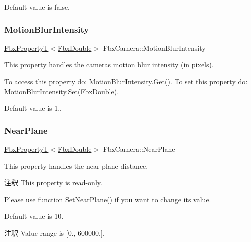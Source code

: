 Default value is false. \mbox{\label{class_fbx_camera_aef324a28772e42e910b983642b635769}} 
\subsubsection{\texorpdfstring{Motion\+Blur\+Intensity}{MotionBlurIntensity}}
{\footnotesize\ttfamily \hyperlink{class_fbx_property_t}{Fbx\+PropertyT}$<$\hyperlink{fbxtypes_8h_a171e72a1c46fc15c1a6c9c31948c1c5b}{Fbx\+Double}$>$ Fbx\+Camera\+::\+Motion\+Blur\+Intensity}

This property handles the camera\textquotesingle{}s motion blur intensity (in pixels).

To access this property do\+: Motion\+Blur\+Intensity.\+Get(). To set this property do\+: Motion\+Blur\+Intensity.\+Set(\+Fbx\+Double).

Default value is 1.. \mbox{\label{class_fbx_camera_adbca6c29099ceac39fb350201fb3163d}} 
\subsubsection{\texorpdfstring{Near\+Plane}{NearPlane}}
{\footnotesize\ttfamily \hyperlink{class_fbx_property_t}{Fbx\+PropertyT}$<$\hyperlink{fbxtypes_8h_a171e72a1c46fc15c1a6c9c31948c1c5b}{Fbx\+Double}$>$ Fbx\+Camera\+::\+Near\+Plane}

This property handles the near plane distance.

\begin{DoxyRemark}{注釈}
This property is read-\/only. 

Please use function \hyperlink{class_fbx_camera_a4ceb2775d2392c380cd8529d78f98c7f}{Set\+Near\+Plane()} if you want to change its value.
\end{DoxyRemark}
Default value is 10. \begin{DoxyRemark}{注釈}
Value range is \mbox{[}0., 600000.\mbox{]}. 
\end{DoxyRemark}
\mbox{\label{class_fbx_camera_af1e8cb54a4d9a16471c6fd56d30cd128}} 
